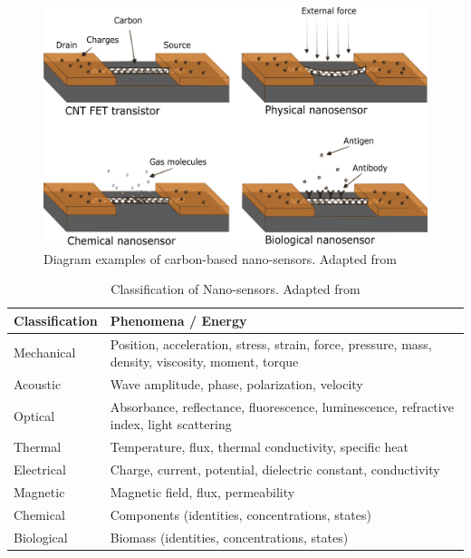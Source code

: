 \begin{figure}[!th]
\centering
\includegraphics[scale=0.50]{./Figures/typesOfNanoSensors.png}
\decoRule
\caption[Types of Nano-sensors]{Diagram examples of carbon-based nano-sensors. Adapted from \cite{BaudritJ2017}}
\label{fig:diameterComparisonOfCarbonFibers}
\end{figure}

\begin{table}[ht]
\centering
\caption[Classification of Nano-sensors]{Classification of Nano-sensors. Adapted from \cite{Khanna2016}}
\begin{tabularx}{\textwidth}{lX}
\hline
\textbf{Classification} & \textbf{Phenomena / Energy} \\
\hline
Mechanical & Position, acceleration, stress, strain, force, pressure, mass, density, viscosity, moment, torque \\
Acoustic & Wave amplitude, phase, polarization, velocity \\
Optical & Absorbance, reflectance, fluorescence, luminescence, refractive index, light scattering \\
Thermal & Temperature, flux, thermal conductivity, specific heat \\
Electrical & Charge, current, potential, dielectric constant, conductivity \\
Magnetic & Magnetic field, flux, permeability \\
Chemical & Components (identities, concentrations, states) \\
Biological & Biomass (identities, concentrations, states) \\
\hline
\end{tabularx}
\label{tab:classificationOfNanosensors}
\end{table}

